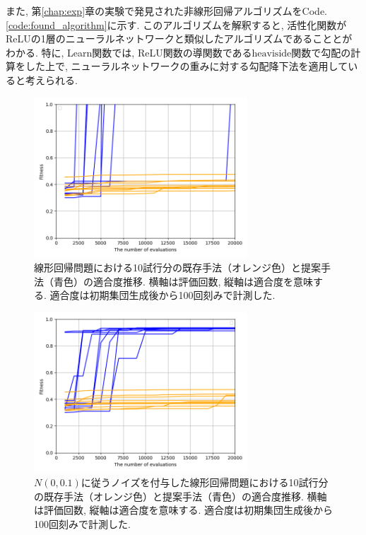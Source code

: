 \documentclass[11pt,oneside,openany,report]{jsbook}
\begin{document}
また, 第\ref{chap:exp}章の実験で発見された非線形回帰アルゴリズムをCode.\ref{code:found_algorithm}に示す. このアルゴリズムを解釈すると, 活性化関数がReLUの1層のニューラルネットワークと類似したアルゴリズムであることとがわかる. 特に, Learn関数では, ReLU関数の導関数である$\mathrm{heaviside}$関数で勾配の計算をした上で, ニューラルネットワークの重みに対する勾配降下法を適用していると考えられる.

\begin{figure}[H]
  \centering
  \includegraphics[width=8cm]{exp/linear_regression.png}
  \caption{線形回帰問題における10試行分の既存手法（オレンジ色）と提案手法（青色）の適合度推移. 横軸は評価回数, 縦軸は適合度を意味する. 適合度は初期集団生成後から100回刻みで計測した.}
  \label{fig:exp:result:linear_regression}
\end{figure}

\begin{figure}[H]
  \centering
  \includegraphics[width=8cm]{exp/noisy_linear_regression.png}
  \caption{$N(0,0.1)$に従うノイズを付与した線形回帰問題における10試行分の既存手法（オレンジ色）と提案手法（青色）の適合度推移. 横軸は評価回数, 縦軸は適合度を意味する. 適合度は初期集団生成後から100回刻みで計測した.}
  \label{fig:exp:result:noisy_linear_regression}
\end{figure}
\end{document}
